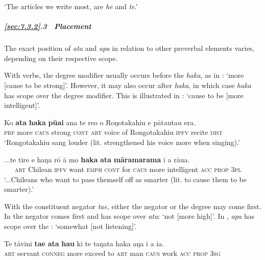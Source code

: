 \glt 
‘The articles we write most, are \textit{he} and \textit{te}.’ \textstyleExampleref{[R616.719]} 
\z

\subparagraph{\ref{sec:7.3.2}.3~ Placement} The exact position of \textit{{\ꞌ}ata} and \textit{{\ꞌ}apa} in relation to other preverbal elements varies, depending on their respective scope.

With  verbs, the degree modifier usually occurs before the   \textit{haka}, as in : ‘more [cause to be strong]’. However, it may also occur after \textit{haka}, in which case \textit{haka} has scope over the degree modifier. This is illustrated in : ‘cause to be [more intelligent]’.

\ea\label{ex:7.98}
\gll Ko \textbf{{\ꞌ}ata} \textbf{haka} \textbf{pūai} {\ꞌ}ana te re{\ꞌ}o o Roŋotakahiu e pāta{\ꞌ}uta{\ꞌ}u era. \\
\textsc{prf} more \textsc{caus} strong \textsc{cont} \textsc{art} voice of Rongotakahiu \textsc{ipfv} recite \textsc{dist} \\

\glt 
‘Rongotakahiu sang louder (lit. strengthened his voice more when singing).’ \textstyleExampleref{[R476.014]} 
\z

\ea\label{ex:7.99}
\gll ...te tire e haŋa rō {\ꞌ}ā mo \textbf{haka} \textbf{{\ꞌ}ata} \textbf{māramarama} i a rāua.\\
~~~\textsc{art} Chilean \textsc{ipfv} want \textsc{emph} \textsc{cont} for \textsc{caus} more intelligent \textsc{acc} \textsc{prop} \textsc{3pl}\\

\glt
‘...Chileans who want to pass themself off as smarter (lit. to cause them to be smarter).’ \textstyleExampleref{[R428.006]} 
\z

With the constituent negator \textit{ta{\ꞌ}e}, either the negator or the degree  may come first. In  the negator comes first and has scope over \textit{{\ꞌ}ata}: ‘not [more high]’. In , \textit{{\ꞌ}apa} has scope over the : ‘somewhat [not listening]’.

\ea\label{ex:7.100}
\gll Te tāvini \textbf{ta{\ꞌ}e} \textbf{{\ꞌ}ata} \textbf{hau} ki te taŋata haka aŋa i a ia. \\
\textsc{art} servant \textsc{conneg} more exceed to \textsc{art} man \textsc{caus} work \textsc{acc} \textsc{prop} \textsc{3sg} \\

